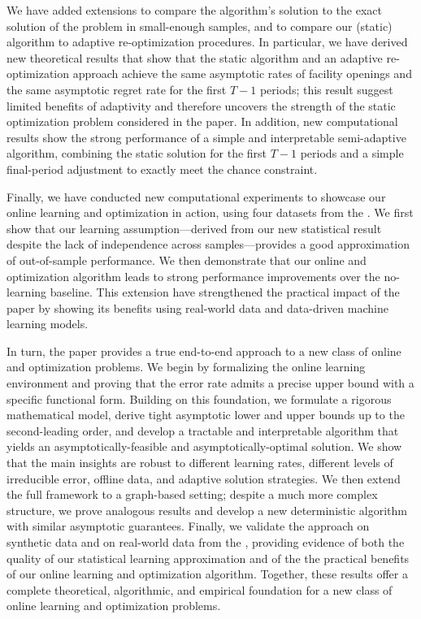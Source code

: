\documentclass[11pt]{article}
\begin{document}
We have added extensions to compare the algorithm's solution to the exact solution of the problem in small-enough samples, and to compare our (static) algorithm to adaptive re-optimization procedures. In particular, we have derived new theoretical results that show that the static algorithm and an adaptive re-optimization approach achieve the same asymptotic rates of facility openings and the same asymptotic regret rate for the first $T-1$ periods; this result suggest limited benefits of adaptivity and therefore uncovers the strength of the static optimization problem considered in the paper. In addition, new computational results show the strong performance of a simple and interpretable semi-adaptive algorithm, combining the static solution for the first $T-1$ periods and a simple final-period adjustment to exactly meet the chance constraint.

Finally, we have conducted new computational experiments to showcase our online learning and optimization in action, using four datasets from the \cite{UCI}. We first show that our learning assumption---derived from our new statistical result despite the lack of independence across samples---provides a good approximation of out-of-sample performance. We then demonstrate that our online and optimization algorithm leads to strong performance improvements over the no-learning baseline. This extension have strengthened the practical impact of the paper by showing its benefits using real-world data and data-driven machine learning models.

In turn, the paper provides a true end-to-end approach to a new class of online and optimization problems. We begin by formalizing the online learning environment and proving that the error rate admits a precise upper bound with a specific functional form. Building on this foundation, we formulate a rigorous mathematical model, derive tight asymptotic lower and upper bounds up to the second-leading order, and develop a tractable and interpretable algorithm that yields an asymptotically-feasible and asymptotically-optimal solution. We show that the main insights are robust to different learning rates, different levels of irreducible error, offline data, and adaptive solution strategies. We then extend the full framework to a graph-based setting; despite a much more complex structure, we prove analogous results and develop a new deterministic algorithm with similar asymptotic guarantees. Finally, we validate the approach on synthetic data and on real-world data from the \cite{UCI}, providing evidence of both the quality of our statistical learning approximation and of the the practical benefits of our online learning and optimization algorithm. Together, these results offer a complete theoretical, algorithmic, and empirical foundation for a new class of online learning and optimization problems.
\end{document}
